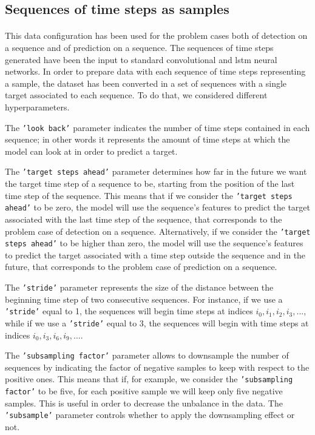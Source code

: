 \subsection{Sequences of time steps as samples}
\paragraph{} This data configuration has been used for the problem cases both of detection on a sequence and of prediction on a sequence. The sequences of time steps generated have been the input to standard convolutional and 
\acs{lstm} neural networks. In order to prepare data with each sequence of time steps representing a sample, the dataset has been converted in a set of sequences with a single target associated to each sequence. To do that, we considered different hyperparameters.

The \texttt{'look back'} parameter indicates the number of time steps contained in each sequence; in other words it represents the amount of time steps at which the model can look at in order to predict a target.

The \texttt{'target steps ahead'} parameter determines how far in the future we want the target time step of a sequence to be, starting from the position of the last time step of the sequence. This means that if we consider the \texttt{'target steps ahead'} to be zero, the model will use the sequence's features to predict the target associated with the last time step of the sequence, that corresponds to the problem case of detection on a sequence. Alternatively, if we consider the \texttt{'target steps ahead'} to be higher than zero, the model will use the sequence's features to predict the target associated with a time step outside the sequence and in the future, that corresponds to the problem case of prediction on a sequence.

The \texttt{'stride'} parameter represents the size of the distance between the beginning time step of two consecutive sequences. For instance, if we use a \texttt{'stride'} equal to 1, the sequences will begin time steps at indices $i_0, i_1, i_2, i_3, ...$, while if we use a \texttt{'stride'} equal to 3, the sequences will begin with time steps at indices $i_0, i_3, i_6, i_9, ...$.

The \texttt{'subsampling factor'} parameter allows to downsample the number of sequences by indicating the factor of negative samples to keep with respect to the positive ones. This means that if, for example, we consider the \texttt{'subsampling factor'} to be five, for each positive sample we will keep only five negative samples. This is useful in order to decrease the unbalance in the data. The \texttt{'subsample'} parameter controls whether to apply the downsampling effect or not.

